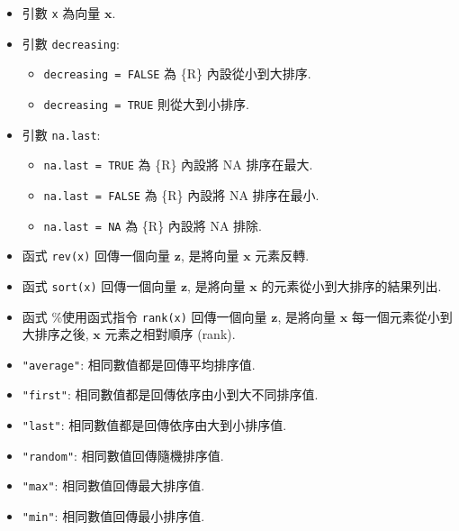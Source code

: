 \documentclass[
]{book}
\providecommand{\tightlist}{%
  \setlength{\itemsep}{0pt}\setlength{\parskip}{0pt}}
\begin{document}
\begin{itemize}
\item
  引數 \texttt{x} 為向量 \(\mathbf{x}\).
\item
  引數 \texttt{decreasing}:

  \begin{itemize}
  \tightlist
  \item
    \texttt{decreasing\ =\ FALSE} 為 \{R\} 內設從小到大排序.
  \item
    \texttt{decreasing\ =\ TRUE} 則從大到小排序.
  \end{itemize}
\item
  引數 \texttt{na.last}:

  \begin{itemize}
  \tightlist
  \item
    \texttt{na.last\ =\ TRUE} 為 \{R\} 內設將 NA 排序在最大.
  \item
    \texttt{na.last\ =\ FALSE} 為 \{R\} 內設將 NA 排序在最小.
  \item
    \texttt{na.last\ =\ NA} 為 \{R\} 內設將 NA 排除.
  \end{itemize}
\item
  函式
  \texttt{rev(x)}
  回傳一個向量 \(\mathbf{z}\), 是將向量 \(\mathbf{x}\) 元素反轉.
\item
  函式
  \texttt{sort(x)}
  回傳一個向量 \(\mathbf{z}\),
  是將向量 \(\mathbf{x}\) 的元素從小到大排序的結果列出.
\item
  函式 \%使用函式指令
  \texttt{rank(x)}
  回傳一個向量 \(\mathbf{z}\), 是將向量
  \(\mathbf{x}\) 每一個元素從小到大排序之後, \(\mathbf{x}\) 元素之相對順序 (rank).
\item
  \texttt{"average"}: 相同數值都是回傳平均排序值.
\item
  \texttt{"first"}: 相同數值都是回傳依序由小到大不同排序值.
\item
  \texttt{"last"}: 相同數值都是回傳依序由大到小排序值.
\item
  \texttt{"random"}: 相同數值回傳隨機排序值.
\item
  \texttt{"max"}: 相同數值回傳最大排序值.
\item
  \texttt{"min"}: 相同數值回傳最小排序值.
\end{itemize}
\end{document}
